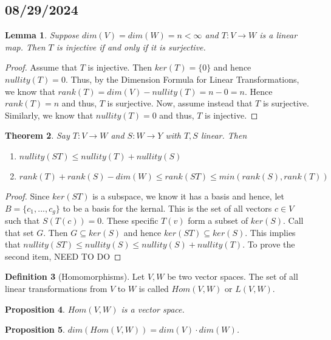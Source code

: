 \documentclass{tufte-handout}
\newtheorem{thm}{Theorem}
\newtheorem{prop}[thm]{Proposition}
\newtheorem{lem}[thm]{Lemma}
\theoremstyle{definition}
\newtheorem{defn}[thm]{Definition}
\theoremstyle{remark}
\begin{document}
\subsection{08/29/2024}

\begin{lem}
    Suppose $dim(V) = dim(W) = n < \infty$ and $T:V \rightarrow W$ is a linear map. Then $T$ is injective if and only if it is surjective.
\end{lem}
\begin{proof}
    Assume that $T$ is injective. Then $ker(T) = \{0\}$ and hence $nullity(T) = 0$. Thus, by the Dimension Formula for Linear Transformations, we know that $rank(T) = dim(V) - nullity(T) = n-0=n$. Hence $rank(T) = n$ and thus, $T$ is surjective. Now, assume instead that $T$ is surjective. Similarly, we know that $nullity(T) = 0$ and thus, $T$ is injective. 
\end{proof}

\begin{thm}
    Say $T:V \rightarrow W$ and $S:W \rightarrow Y$ with $T, S$ linear. Then 
    \begin{enumerate}
        \item $nullity(ST) \leq nullity(T) + nullity(S)$
        \item $rank(T) + rank(S) - dim(W) \leq rank(ST) \leq  min(rank(S), rank(T))$
    \end{enumerate}
\end{thm}

\begin{proof}
    Since $ker(ST)$ is a subspace, we know it has a basis and hence, let $B = \{c_1, ..., c_g\}$ to be a basis for the kernal. This is the set of all vectors $c\in V$ such that $S(T(c)) = 0$. These specific $T(v)$ form a subset of $ker(S)$. Call that set $G$. Then $G \subseteq ker(S)$ and hence $ker(ST) \subseteq ker(S)$. This implies that $nullity(ST) \leq nullity(S) \leq nullity(S) + nullity(T)$.
    \newline
    To prove the second item, NEED TO DO
\end{proof}

\begin{defn}[Homomorphisms]
    Let $V, W$ be two vector spaces. The set of all linear transformations from $V$ to $W$ is called $Hom(V,W)$ or $L(V, W)$. 
\end{defn}

\begin{prop}
    $Hom(V, W)$ is a vector space.
\end{prop}

\begin{prop}
    $dim(Hom(V, W)) = dim(V)\cdot dim(W)$.
\end{prop}
\end{document}

